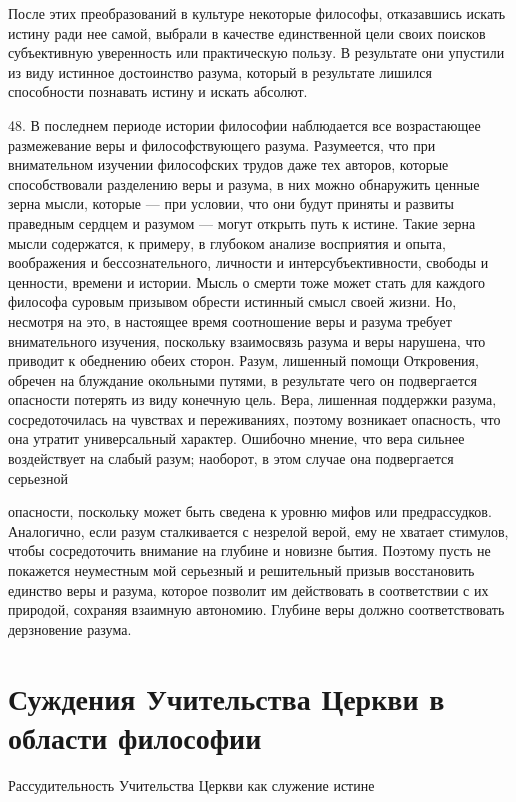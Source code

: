 \documentclass[a5paper,10pt]{article}
\begin{document}
После этих преобразований в культуре некоторые философы, отказавшись искать
истину ради нее самой, выбрали в качестве единственной цели своих поисков
субъективную уверенность или практическую пользу. В результате они упустили из
виду истинное достоинство разума, который в результате лишился способности
познавать истину и искать абсолют.

48. В последнем периоде истории философии наблюдается все возрастающее
размежевание веры и философствующего разума. Разумеется, что при внимательном
изучении философских трудов даже тех авторов, которые способствовали разделению
веры и разума, в них можно обнаружить ценные зерна мысли, которые — при
условии, что они будут приняты и развиты праведным сердцем и разумом — могут
открыть путь к истине. Такие зерна мысли содержатся, к примеру, в глубоком
анализе восприятия и опыта, воображения и бессознательного, личности и
интерсубъективности, свободы и ценности, времени и истории. Мысль о смерти тоже
может стать для каждого философа суровым призывом обрести истинный смысл своей
жизни. Но, несмотря на это, в настоящее время соотношение веры и разума требует
внимательного изучения, поскольку взаимосвязь разума и веры нарушена, что
приводит к обеднению обеих сторон. Разум, лишенный помощи Откровения, обречен
на блуждание окольными путями, в результате чего он подвергается опасности
потерять из виду конечную цель. Вера, лишенная поддержки разума,
сосредоточилась на чувствах и переживаниях, поэтому возникает опасность, что
она утратит универсальный характер. Ошибочно мнение, что вера сильнее
воздействует на слабый разум; наоборот, в этом случае она подвергается
серьезной

опасности, поскольку может быть сведена к уровню мифов или предрассудков.
Аналогично, если разум сталкивается с незрелой верой, ему не хватает стимулов,
чтобы сосредоточить внимание на глубине и новизне бытия. Поэтому пусть не
покажется неуместным мой серьезный и решительный призыв восстановить единство
веры и разума, которое позволит им действовать в соответствии с их природой,
сохраняя взаимную автономию. Глубине веры должно соответствовать дерзновение
разума.

\section{Суждения Учительства Церкви в области философии}

Рассудительность Учительства Церкви как служение истине 
\end{document}
